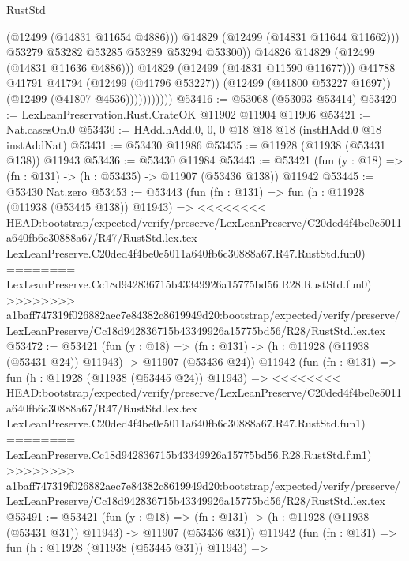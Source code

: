 \begin{lexlean}{RustStd}
\begin{coremodule}
{\begin{coremodule}
{{{{{{{{{{{{{{{{{{{{{{{{{{{{{{{{{{{{{{{{{{{{{{{{{{{{{{{{{{{{{{{{{{{{{{{{{{{{{{{{                                  (@12499 (@14831 @11654 @4886)))
                                @14829
                                (@12499 (@14831 @11644 @11662)))
                              @53279
                              @53282
                              @53285
                              @53289
                              @53294
                              @53300))
                          @14826
                          @14829
                          (@12499 (@14831 @11636 @4886)))
                        @14829
                        (@12499 (@14831 @11590 @11677)))
                      @41788
                      @41791
                      @41794
                      (@12499 (@41796 @53227))
                      (@12499 (@41800 @53227 @1697))
                      (@12499 (@41807 @4536)))))))))))
@53416 := @53068 (@53093 @53414)
@53420 := LexLeanPreservation.Rust.CrateOK @11902 @11904 @11906
@53421 := Nat.casesOn.{0}
@53430 := HAdd.hAdd.{0, 0, 0} @18 @18 @18 (instHAdd.{0} @18 instAddNat)
@53431 := @53430 @11986
@53435 := @11928 (@11938 (@53431 @138)) @11943
@53436 := @53430 @11984
@53443 := @53421 (fun (y : @18) => (fn : @131) -> (h : @53435) -> @11907 (@53436 @138)) @11942
@53445 := @53430 Nat.zero
@53453 := @53443
    (fun (fn : @131) =>
    fun (h : @11928 (@11938 (@53445 @138)) @11943) =>
<<<<<<<< HEAD:bootstrap/expected/verify/preserve/LexLeanPreserve/C20ded4f4be0e5011a640fb6c30888a67/R47/RustStd.lex.tex
    LexLeanPreserve.C20ded4f4be0e5011a640fb6c30888a67.R47.RustStd.fun0)
========
    LexLeanPreserve.Cc18d942836715b43349926a15775bd56.R28.RustStd.fun0)
>>>>>>>> a1baff747319f026882aec7e84382c8619949d20:bootstrap/expected/verify/preserve/LexLeanPreserve/Cc18d942836715b43349926a15775bd56/R28/RustStd.lex.tex
@53472 := @53421
    (fun (y : @18) =>
    (fn : @131) -> (h : @11928 (@11938 (@53431 @24)) @11943) -> @11907 (@53436 @24))
    @11942
    (fun (fn : @131) =>
    fun (h : @11928 (@11938 (@53445 @24)) @11943) =>
<<<<<<<< HEAD:bootstrap/expected/verify/preserve/LexLeanPreserve/C20ded4f4be0e5011a640fb6c30888a67/R47/RustStd.lex.tex
    LexLeanPreserve.C20ded4f4be0e5011a640fb6c30888a67.R47.RustStd.fun1)
========
    LexLeanPreserve.Cc18d942836715b43349926a15775bd56.R28.RustStd.fun1)
>>>>>>>> a1baff747319f026882aec7e84382c8619949d20:bootstrap/expected/verify/preserve/LexLeanPreserve/Cc18d942836715b43349926a15775bd56/R28/RustStd.lex.tex
@53491 := @53421
    (fun (y : @18) =>
    (fn : @131) -> (h : @11928 (@11938 (@53431 @31)) @11943) -> @11907 (@53436 @31))
    @11942
    (fun (fn : @131) =>
    fun (h : @11928 (@11938 (@53445 @31)) @11943) =>
}}}}}}}}}}}}}}}}}}}}}}}}}}}}}}}}}}}}}}}}}}}}}}}}}}}}}}}}}}}}}}}}}}}}}}}}}}}}}}}}
\end{coremodule}}
\end{coremodule}
\end{lexlean}
